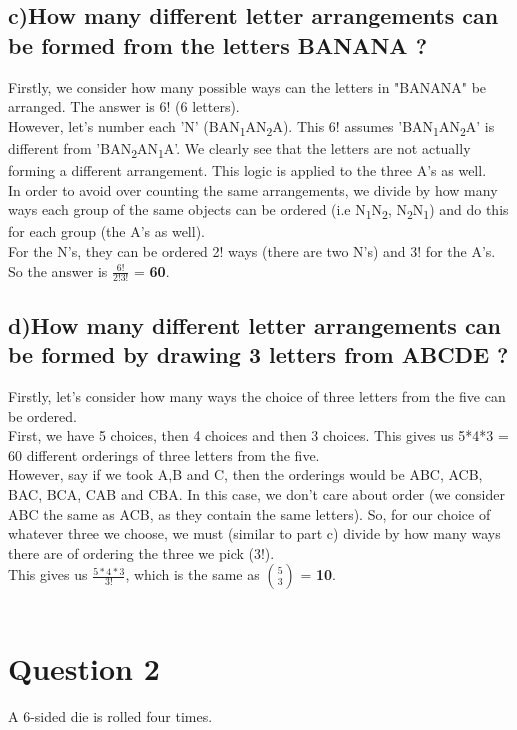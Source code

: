 \documentclass{report}
\begin{document}
		\subsection*{c)How many different letter arrangements can be formed from the letters BANANA ?}
		Firstly, we consider how many possible ways can the letters in "BANANA" be arranged. The answer is 6! (6 letters).\\However, let's number each 'N' (BAN\textsubscript{1}AN\textsubscript{2}A). This 6! assumes 'BAN\textsubscript{1}AN\textsubscript{2}A' is different from 'BAN\textsubscript{2}AN\textsubscript{1}A'. We clearly see that the letters are not actually forming a different arrangement. This logic is applied to the three A's as well.\\In order to avoid over counting the same arrangements, we divide by how many ways each group of the same objects can be ordered (i.e N\textsubscript{1}N\textsubscript{2}, N\textsubscript{2}N\textsubscript{1}) and do this for each group (the A's as well).\\For the N's, they can be ordered 2! ways (there are two N's) and 3! for the A's.\\
		So the answer is $\frac{6!}{2!3!}$ = \textbf{60}. 
		\subsection*{d)How many different letter arrangements can be formed by drawing 3 letters from ABCDE ?}
		Firstly, let's consider how many ways the choice of three letters from the five can be ordered.\\First, we have 5 choices, then 4 choices and then 3 choices. This gives us 5*4*3 = 60 different orderings of three letters from the five.\\However, say if we took A,B and C, then the orderings would be ABC, ACB, BAC, BCA, CAB and CBA. In this case, we don't care about order (we consider ABC the same as ACB, as they contain the same letters). So, for our choice of whatever three we choose, we must (similar to part c) divide by how many ways there are of ordering the three we pick (3!).\\This gives us $\frac{5*4*3}{3!}$, which is the same as ${5 \choose 3}$ = \textbf{10}.\\\\
	
	\section*{\hfil Question 2 \hfil}
	A 6-sided die is rolled four times.
\end{document}
